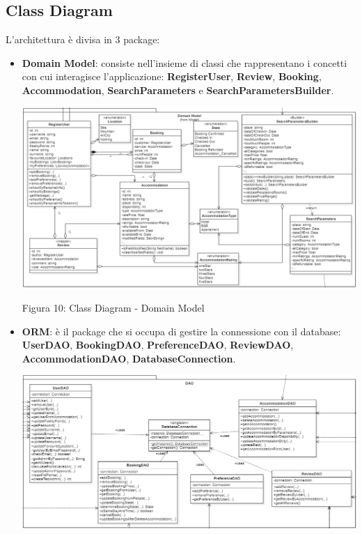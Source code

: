 \documentclass[10pt]{article}
\begin{document}
\subsection{Class Diagram}
L'architettura è divisa in 3 package:
\begin{itemize}
\label{domainmodel}
\item \textbf{Domain Model}: consiste nell’insieme di classi che rappresentano i concetti con cui interagisce l’applicazione: \textbf{RegisterUser}, \textbf{Review}, \textbf{Booking}, \textbf{Accommodation}, \textbf{SearchParameters} e \textbf{SearchParametersBuilder}.
\par\medskip
\hspace*{-2cm}
\includegraphics[scale=0.58]{uml/DomainModel}
\par\medskip
\begin{center}
Figura 10: Class Diagram - Domain Model 
\end{center}
\par\medskip
\vspace{-0.3cm}
\item \textbf{ORM}: è il package che si occupa di gestire la connessione con il database: \textbf{UserDAO}, \textbf{BookingDAO}, \textbf{PreferenceDAO}, \textbf{ReviewDAO}, \textbf{AccommodationDAO}, \textbf{DatabaseConnection}.
\par\medskip
\hspace*{-1.75cm}
\includegraphics[scale=0.58]{uml/DAO}

\end{itemize}
\end{document}
